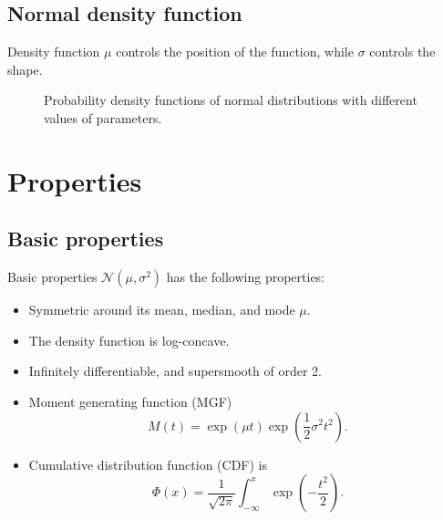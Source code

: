 \documentclass{beamer}
\begin{document}
\subsection{Normal density function}

\begin{frame}{Density function}
  \(\mu\) controls the position of the function, while \(\sigma\) controls the
  shape.
  \begin{figure}[ht]
    \centering
    \caption{Probability density functions of normal distributions with
      different values of parameters.}
  \end{figure}
\end{frame}

\section{Properties}

\subsection{Basic properties}

\begin{frame}{Basic properties}
  \(\mathcal{N}(\mu, \sigma^{2})\) has the following properties:
  \begin{itemize}
  \item<1-> Symmetric around its mean, median, and mode \(\mu\).
  \item<2-> The density function is log-concave.
  \item<3-> Infinitely differentiable, and supersmooth of order 2.
  \item<4-> Moment generating function (MGF)
    \begin{equation}
      M(t) = \exp(\mu t)\exp\left(\frac{1}{2}\sigma^{2}t^{2}\right).
    \end{equation}
  \item<5-> Cumulative distribution function (CDF) is
    \begin{equation}
      \Phi(x) = \frac{1}{\sqrt{2\pi}}
      \int_{-\infty}^{x}\exp\left(-\frac{t^{2}}{2}\right).
    \end{equation}
  \end{itemize}
\end{frame}
\end{document}
